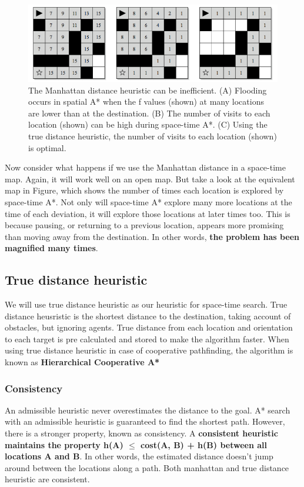 \begin{figure}[h]
    \centering
    \includegraphics[width=1.0\textwidth]{cooperative2}
    \caption{The Manhattan distance heuristic can be inefficient. (A) Flooding occurs in
    spatial A* when the f values (shown) at many locations are lower than at the destination.
    (B) The number of visits to each location (shown) can be high during space-time A*. (C)
    Using the true distance heuristic, the number of visits to each location (shown) is optimal.\cite{ARTICLE:8}}
    \label{image-myimage2}
\end{figure}

Now consider what happens if we use the Manhattan distance in a space-time map.
Again, it will work well on an open map. But take a look at the equivalent map in Figure, which shows
 the number of times each location is explored by space-time A*. Not
only will space-time A* explore many more locations at the time of each deviation, it will
explore those locations at later times too. This is because pausing, or returning to a
previous location, appears more promising than moving away from the destination. In
other words, \textbf{the problem has been magnified many times}.

\subsection{True distance heuristic}
We will use true distance heuristic as our heuristic for space-time search. True distance heusristic is 
the shortest distance to the destination, taking account of obstacles, but ignoring agents.
True distance from each location and orientation to each target is pre calculated and stored to make the 
algorithm faster. When using true distance heuristic in case of cooperative pathfinding, the algorithm is 
known as \textbf{Hierarchical Cooperative A*}

\subsubsection{Consistency}
An admissible heuristic never overestimates the distance to the goal. A* search with an
admissible heuristic is guaranteed to find the shortest path. However, there is a stronger
property, known as consistency. A \textbf{consistent heuristic maintains the property
h(A) $\leq$ cost(A, B) + h(B) between all locations A and B}. In other words, the estimated
distance doesn’t jump around between the locations along a path. Both manhattan and true distance heuristic
are consistent.


